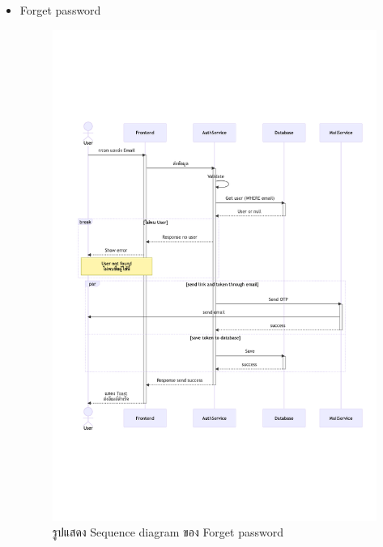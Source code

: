 \documentclass[12pt,oneside,openright,a4paper]{cpe-thai-project}
\begin{document}
\begin{itemize}
    \newpage
    \item Forget password \\
    \begin{figure}[!ht]\centering
        \includegraphics[width=13cm, trim={0 7cm 0 7cm},clip]{./assets/sequence-diagram/forget-password.png}
        \caption{รูปแสดง Sequence diagram ของ Forget password}\label{fig:sqForgetPassword}
    \end{figure}


\end{itemize}
\end{document}
